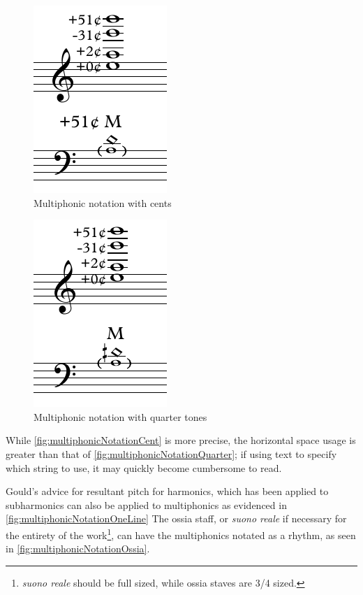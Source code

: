 \begin{figure}
  \centering
  \includegraphics{./resources/multiphonicNotationCent.pdf}
  \caption{Multiphonic notation with cents}\label{fig:multiphonicNotationCent}
\end{figure}

\begin{figure}
  \centering
  \includegraphics{./resources/multiphonicNotationQuarter.pdf}
  \caption{Multiphonic notation with quarter tones}\label{fig:multiphonicNotationQuarter}
\end{figure}
While \autoref{fig:multiphonicNotationCent} is more precise, the horizontal space usage is greater than that of \autoref{fig:multiphonicNotationQuarter}; if using text to specify which string to use, it may quickly become cumbersome to read.


Gould's advice for resultant pitch for harmonics, which has been applied to subharmonics can also be applied to multiphonics as evidenced in \autoref{fig:multiphonicNotationOneLine}
The ossia staff, or \emph{suono reale} if necessary for the entirety of the work\footnote{\emph{suono reale} should be full sized, while ossia staves are 3/4 sized.}, can have the multiphonics notated as a rhythm, as seen in \autoref{fig:multiphonicNotationOssia}.

